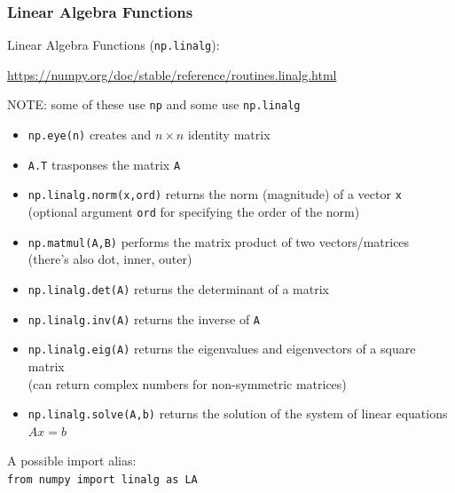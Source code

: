 \documentclass{beamer}
\newcommand{\code}[1]{\texttt{#1}}
\begin{document}
\begin{frame}	
	\frametitle{Linear Algebra Functions}
	
	\begin{block}{Linear Algebra Functions (\code{np.linalg}):}
		\scriptsize
		
		\href{https://numpy.org/doc/stable/reference/routines.linalg.html}{https://numpy.org/doc/stable/reference/routines.linalg.html}
		
		\vspace{10pt}
		NOTE: some of these use \code{np} and some use \code{np.linalg}
		\begin{itemize}
			\item \code{np.eye(n)} creates and $n\times n$ identity matrix
			\item \code{A.T} trasponses the matrix \code{A}
			\item \code{np.linalg.norm(x,ord)} returns the norm (magnitude) of a vector \code{x} (optional argument \code{ord} for specifying the order of the norm)
			\item \code{np.matmul(A,B)} performs the matrix product of two vectors/matrices \\
					(there's also dot, inner, outer)
			\item \code{np.linalg.det(A)} returns the determinant of a matrix
			\item \code{np.linalg.inv(A)} returns the inverse of \code{A}
			\item \code{np.linalg.eig(A)} returns the eigenvalues and eigenvectors of a square matrix \\
					(can return complex numbers for non-symmetric matrices)
			\item \code{np.linalg.solve(A,b)} returns the solution of the system of linear equations $Ax=b$
		\end{itemize}
		
		A possible import alias: \\
		\code{from numpy import linalg as LA}
	\end{block}
	
\end{frame}
\end{document}

